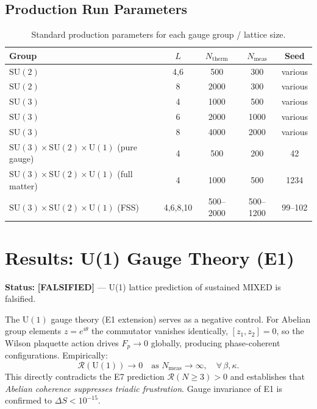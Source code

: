 \documentclass[12pt,a4paper]{article}
\newcommand{\R}{\mathcal{R}}           %
\newcommand{\SU}[1]{\mathrm{SU}(#1)}
\newcommand{\UN}[1]{\mathrm{U}(#1)}
\newcommand{\SM}{\SU{3}\!\times\!\SU{2}\!\times\!\UN{1}}
\newcommand{\falsified}{\textcolor{red!70!black}{\textbf{[FALSIFIED]}}}
\theoremstyle{plain}
\theoremstyle{definition}
\theoremstyle{remark}
\begin{document}
\subsection{Production Run Parameters}

\begin{table}[ht]
\centering
\caption{Standard production parameters for each gauge group / lattice size.}
\label{tab:run_params}
\begin{tabular}{lcccc}
\toprule
Group & $L$ & $N_\text{therm}$ & $N_\text{meas}$ & Seed \\
\midrule
$\SU{2}$            & 4,6   & 500  & 300  & various \\
$\SU{2}$            & 8     & 2000 & 300  & various \\
$\SU{3}$            & 4     & 1000 & 500  & various \\
$\SU{3}$            & 6     & 2000 & 1000 & various \\
$\SU{3}$            & 8     & 4000 & 2000 & various \\
$\SM$ (pure gauge)  & 4     & 500  & 200  & 42     \\
$\SM$ (full matter) & 4     & 1000 & 500  & 1234   \\
$\SM$ (FSS)         & 4,6,8,10 & 500--2000 & 500--1200 & 99--102 \\
\bottomrule
\end{tabular}
\end{table}

\section{Results: U(1) Gauge Theory (E1)}
\label{sec:u1}

\begin{statusbox}
\textbf{Status:} \falsified{} --- U(1) lattice prediction of sustained MIXED is falsified.
\end{statusbox}

The $\UN{1}$ gauge theory (E1 extension) serves as a negative control.
For Abelian group elements $z=e^{i\theta}$ the commutator vanishes identically,
$[z_1,z_2]=0$, so the Wilson plaquette action drives $F_p\to 0$ globally, producing
phase-coherent configurations.
Empirically:
\[
  \R(\UN{1}) \to 0 \quad \text{as } N_\text{meas}\to\infty,\quad
  \forall\,\beta,\kappa.
\]
This directly contradicts the E7 prediction $\R(N\geq 3)>0$ and establishes that
\emph{Abelian coherence suppresses triadic frustration}.
Gauge invariance of E1 is confirmed to $\Delta S<10^{-15}$.
\end{document}
